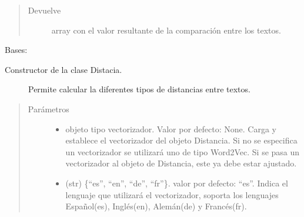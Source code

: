 \documentclass[letterpaper,10pt,openany,spanish]{sphinxmanual}
\begin{document}
\begin{fulllineitems}
\begin{fulllineitems}
\begin{quote}
\begin{description}
\item[{Devuelve}] \leavevmode
array con el valor resultante de la comparación entre los 
textos.

\end{description}\end{quote}

\end{fulllineitems}


\end{fulllineitems}


\begin{fulllineitems}
\label{\detokenize{funciones/comparacion:comparacion.Distancia}}
Bases: 
\begin{description}
\item[{Constructor de la clase Distacia. }] \leavevmode
Permite calcular la diferentes tipos de distancias entre textos.

\end{description}
\begin{quote}\begin{description}
\item[{Parámetros}] \leavevmode\begin{itemize}
\item {} 
 \textendash{} objeto tipo vectorizador. 
Valor por defecto: None. 
Carga y establece el vectorizador del objeto Distancia. 
Si no se especifica un 
vectorizador se utilizará uno de tipo Word2Vec. Si se pasa un 
vectorizador al objeto de Distancia, este ya debe estar ajustado.

\item {} 
 \textendash{} (str) \{“es”, “en”, “de”, “fr”\}. 
valor por defecto: “es”. Indica el lenguaje que utilizará el 
vectorizador, soporta los lenguajes Español(es), Inglés(en), 
Alemán(de) y Francés(fr).

\end{itemize}

\end{description}\end{quote}


\end{fulllineitems}
\end{document}
